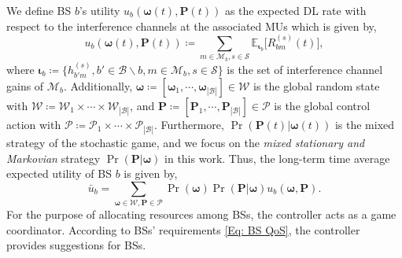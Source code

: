 \documentclass[conference]{IEEEtran}
\begin{document}
We define BS $b$'s utility $u_{b}(\boldsymbol{\omega}(t),\mathbf{P}(t))$ as the expected DL rate with respect to the interference channels at the associated MUs which is given by,
%
%
%
\begin{equation}\label{Eq: BS's utility}
\textstyle u_{b}(\boldsymbol{\omega}(t),\mathbf{P}(t))\coloneqq\sum\limits_{m\in\mathcal{M}_b,s\in\mathcal{S}}\mathbb{E}_{\boldsymbol{\iota}_b}\big[R_{bm}^{(s)}(t)\big],
\end{equation}
%
%
%
where $\boldsymbol{\iota}_b\coloneqq\{h_{b'm}^{(s)},b'\in\mathcal{B}\backslash b,m\in\mathcal{M}_b,s\in\mathcal{S}\}$ is the set of interference channel gains of $\mathcal{M}_b$. Additionally, $\boldsymbol{\omega}\coloneqq[\boldsymbol{\omega}_1,\cdots,\boldsymbol{\omega}_{|\mathcal{B}|}]\in\mathcal{W}$ is the global random state with $\mathcal{W}\coloneqq\mathcal{W}_1\times\cdots\times\mathcal{W}_{|\mathcal{B}|}$, and $\mathbf{P}\coloneqq[\mathbf{P}_1,\cdots,\mathbf{P}_{|\mathcal{B}|}]\in\mathcal{P}$ is the global control action with $\mathcal{P}\coloneqq\mathcal{P}_1\times\cdots\times\mathcal{P}_{|\mathcal{B}|}$.
%
%
%
Furthermore, $\Pr(\mathbf{P}(t)|  \boldsymbol{\omega}(t))$ is the mixed strategy of the stochastic game, and we focus on the \emph{mixed stationary and Markovian} strategy $\Pr(\mathbf{P}|\boldsymbol{\omega})$ in this work.
Thus, the long-term time average expected utility of BS $b$ is given by,
%
%
\begin{equation}\label{Eq: BS's stationary utility}
\textstyle\bar{u}_{b}=\sum\limits_{\boldsymbol{\omega}\in\mathcal{W},\mathbf{P}\in\mathcal{P}} \Pr(\boldsymbol{\omega})\Pr(\mathbf{P}|  \boldsymbol{\omega})u_b(\boldsymbol{\omega},\mathbf{P}).
\end{equation}
%
%
%
For the purpose of allocating resources among BSs, the controller acts as a game coordinator. According to BSs' requirements \eqref{Eq: BS QoS}, the controller provides suggestions for BSs.
\end{document}
